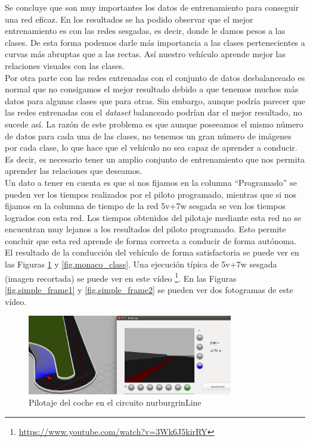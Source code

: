 Se concluye que son muy importantes los datos de entrenamiento para conseguir una red eficaz. En los resultados se ha podido observar que el mejor entrenamiento es con las redes sesgadas, es decir, donde le damos pesos a las clases. De esta forma podemos darle más importancia a las clases pertenecientes a curvas más abruptas que a las rectas. Así nuestro vehículo aprende mejor las relaciones visuales con las clases. \\

Por otra parte con las redes entrenadas con el conjunto de datos desbalanceado es normal que no consigamos el mejor resultado debido a que tenemos muchos más datos para algunas clases que para otras. Sin embargo, aunque podría parecer que las redes entrenadas con el \textit{dataset} balanceado podrían dar el mejor resultado, no sucede así. La razón de este problema es que aunque poseeamos el mismo número de datos para cada una de las clases, no tenemos un gran número de imágenes por cada clase, lo que hace que el vehículo no sea capaz de aprender a conducir. Es decir, es necesario tener un amplio conjunto de entrenamiento que nos permita aprender las relaciones que deseamos.\\


Un dato a tener en cuenta es que si nos fijamos en la columna ``Programado'' se pueden ver los tiempos realizados por el piloto programado, mientras que si nos fijamos en la columna de tiempo de la red 5v+7w sesgada se ven los tiempos logrados con esta red. Los tiempos obtenidos del pilotaje mediante esta red no se encuentran muy lejanos a los resultados del piloto programado. Esto permite concluir que esta red aprende de forma correcta a conducir de forma autónoma. El resultado de la conducción del vehículo de forma satisfactoria se puede ver en las Figuras \ref{fig.nurburgrin_class} y \ref{fig.monaco_class}. Una ejecución típica de 5v+7w sesgada (imagen recortada) se puede ver en este vídeo  \footnote{\url{https://www.youtube.com/watch?v=3Wk6J5kirRY}}. En las Figuras \ref{fig.simple_frame1} y \ref{fig.simple_frame2} se pueden ver dos fotogramas de este vídeo. \\

\begin{figure}[H]
\begin{center}
	\includegraphics[width=0.8\textwidth]{figures/Clasificacion/nurburgrin_class.png}
   \caption{Pilotaje del coche en el circuito nurburgrinLine}
	\label{fig.nurburgrin_class}
\end{center}
\end{figure}

